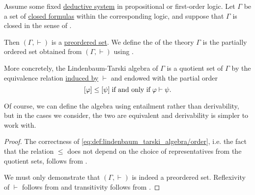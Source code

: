 \begin{definition}\label{def:lindenbaum_tarski_algebra}
  Assume some fixed \hyperref[def:deduction_system]{deductive system} in propositional or first-order logic. Let \( \Gamma \) be a set of \hyperref[def:first_order_syntax/closed_formula]{closed formulas} within the corresponding logic, and suppose that \( \Gamma \) is closed in the sense of .

  Then \( (\Gamma, \vdash) \) is a \hyperref[def:preordered_set]{preordered set}. We define the  of the theory \( \Gamma \) is the partially ordered set obtained from \( (\Gamma, \vdash) \) using .

  More concretely, the Lindenbaum-Tarski algebra of \( \Gamma \) is a quotient set of \( \Gamma \) by the equivalence relation \hyperref[thm:equivalence_closure]{induced by} \( \vdash \) and endowed with the partial order
  \begin{equation}\label{eq:def:lindenbaum_tarski_algebra/order}
    [\varphi] \leq [\psi] \T{if and only if} \varphi \vdash \psi.
  \end{equation}
\end{definition}
\begin{comments}
  \item Of course, we can define the algebra using entailment rather than derivability, but in the cases we consider, the two are equivalent and derivability is simpler to work with.
\end{comments}
\begin{proof}
  The correctness of \eqref{eq:def:lindenbaum_tarski_algebra/order}, i.e. the fact that the relation \( \leq \) does not depend on the choice of representatives from the quotient sets, follows from .

  We must only demonstrate that \( (\Gamma, \vdash) \) is indeed a preordered set. Reflexivity of \( \vdash \) follows from  and transitivity follows from .
\end{proof}

